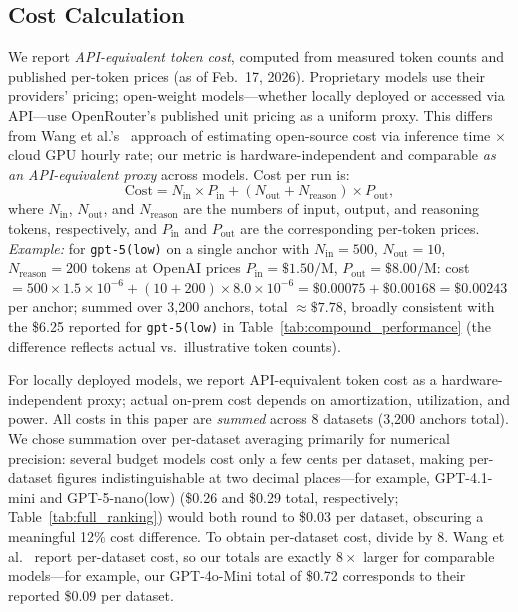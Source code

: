 \documentclass[runningheads]{llncs}
\begin{document}
\subsection{Cost Calculation}
\label{sec:cost}

We report \emph{API-equivalent token cost}, computed from measured token counts and published per-token prices (as of Feb.\ 17, 2026). Proprietary models use their providers' pricing; open-weight models---whether locally deployed or accessed via API---use OpenRouter's published unit pricing as a uniform proxy. This differs from Wang et al.'s~\cite{wang2025match} approach of estimating open-source cost via inference time $\times$ cloud GPU hourly rate; our metric is hardware-independent and comparable \emph{as an API-equivalent proxy} across models. Cost per run is:
\begin{equation}
\text{Cost} = N_{\text{in}} \times P_{\text{in}} + (N_{\text{out}} + N_{\text{reason}}) \times P_{\text{out}},
\label{eq:cost}
\end{equation}
where $N_{\text{in}}$, $N_{\text{out}}$, and $N_{\text{reason}}$ are the numbers of input, output, and reasoning tokens, respectively, and $P_{\text{in}}$ and $P_{\text{out}}$ are the corresponding per-token prices. 
\emph{Example:} for \texttt{gpt-5(low)} on a single anchor with $N_\text{in}{=}500$, $N_\text{out}{=}10$, $N_\text{reason}{=}200$ tokens at OpenAI prices $P_\text{in}{=}\$1.50/\text{M}$, $P_\text{out}{=}\$8.00/\text{M}$: cost $= 500{\times}1.5{\times}10^{-6} + (10{+}200){\times}8.0{\times}10^{-6} = \$0.00075 + \$0.00168 = \$0.00243$ per anchor; summed over 3,200 anchors, total $\approx\$7.78$, broadly consistent with the \$6.25 reported for \texttt{gpt-5(low)} in Table~\ref{tab:compound_performance} (the difference reflects actual vs.\ illustrative token counts).

For locally deployed models, we report API-equivalent token cost as a hardware-independent proxy; actual on-prem cost depends on amortization, utilization, and power. All costs in this paper are \emph{summed} across 8 datasets (3{,}200 anchors total). We chose summation over per-dataset averaging primarily for numerical precision: several budget models cost only a few cents per dataset, making per-dataset figures indistinguishable at two decimal places---for example, GPT-4.1-mini and GPT-5-nano(low) (\$0.26 and \$0.29 total, respectively; Table~\ref{tab:full_ranking}) would both round to \$0.03 per dataset, obscuring a meaningful 12\% cost difference. To obtain per-dataset cost, divide by 8. Wang et al.~\cite{wang2025match} report per-dataset cost, so our totals are exactly $8\times$ larger for comparable models---for example, our GPT-4o-Mini total of \$0.72 corresponds to their reported \$0.09 per dataset.
\end{document}
